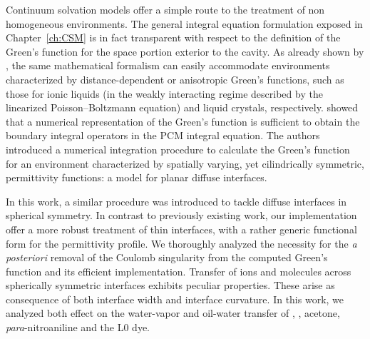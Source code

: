 Continuum solvation models offer a simple route to the treatment of non
homogeneous environments.
The general integral equation formulation exposed in Chapter~\ref{ch:CSM} is in
fact transparent with respect to the definition of the Green's function for the
space portion exterior to the cavity.
As already shown by \citeauthor{Cances1998-og}, the same mathematical formalism can easily accommodate
environments characterized by distance-dependent or anisotropic Green's functions, such as those for
ionic liquids (in the weakly interacting regime described by the linearized Poisson--Boltzmann equation)
and liquid crystals, respectively.
\citeauthor{Frediani2004-er} showed that a numerical representation of the
Green's function is sufficient to obtain the boundary integral operators in the
\acs{PCM} integral equation.
The authors introduced a numerical integration procedure to calculate the
Green's function for an environment characterized by spatially varying, yet
cilindrically symmetric, permittivity functions: a model for planar diffuse interfaces.

In this work, a similar procedure was introduced to tackle diffuse interfaces
in spherical symmetry.
In contrast to previously existing work, our implementation offer a more robust
treatment of thin interfaces, with a rather generic functional form for the
permittivity profile.
We thoroughly analyzed the necessity for the \emph{a posteriori} removal of the
Coulomb singularity from the computed Green's function and its efficient
implementation.
Transfer of ions and molecules across spherically symmetric interfaces exhibits
peculiar properties. These arise as consequence of both interface width and
interface curvature.
In this work, we analyzed both effect on the water-vapor and oil-water transfer
of , , acetone, \emph{para}-nitroaniline and the L0 dye.

